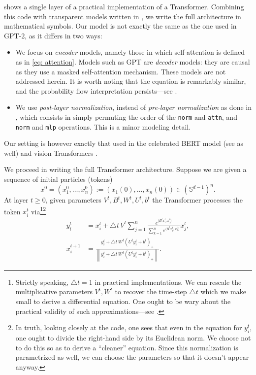 \documentclass[a4paper,11pt]{article}
\theoremstyle{plain}
\renewcommand{\S}{\mathbb{S}^{d-1}}
\newcommand{\bW}{\bm{\mathit{W}}}
\newcommand{\bV}{\bm{\mathit{V}}}
\newcommand{\bB}{\bm{\mathit{B}}}
\newcommand{\bU}{\bm{\mathit{U}}}
\renewcommand{\geq}{\geqslant}
\numberwithin{equation}{section}
\begin{document}
 shows a single layer of a practical implementation of a Transformer. Combining this code with transparent models written in \cite{lu2019understanding, sander2022sinkformers}, we write the full architecture in mathematical symbols. Our model is not exactly the same as the one used in {\sf GPT-2}, as it differs in two ways: 
\begin{itemize}
\item We focus on \emph{encoder} models, namely those in which  self-attention is defined as in \eqref{eq: attention}. Models such as {\sf GPT} are \emph{decoder} models: they are causal as they use a masked self-attention mechanism. 
These models are not addressed herein. It is worth noting that the equation is remarkably similar, and the probability flow interpretation persists---see \cite{castin2023understanding}.

\item We use \emph{post-layer normalization}, instead of \emph{pre-layer normalization} as done in , which consists in simply permuting the order of the {\tt norm} and {\tt attn}, and {\tt norm} and {\tt mlp} operations. This is a minor modeling detail.
\end{itemize}
Our setting is however exactly that used in the celebrated {\sf BERT} model \cite{devlin2018bert} (see \cite[Algorithm 9]{phuong2022formal} as well) and vision Transformers \cite{dosovitskiy2020image}.

We proceed in writing the full Transformer architecture. Suppose we are given a sequence of initial particles (tokens)
\begin{equation*}
    x^0=(x_1^0,\ldots,x_n^0):=(x_1(0),\ldots,x_n(0))\in(\S)^n.
\end{equation*}
At layer $t\geq0$, given parameters $\bV^t, \bB^t, \bW^t, \bU^t, b^t$ the Transformer processes the token $x_i^t$ via\footnote{Strictly speaking, $\bigtriangleup t=1$ in practical implementations. We can rescale the multiplicative parameters $\bV^t,\bW^t$ to recover the time-step  $\bigtriangleup t$ which we make small to derive a differential equation. One ought to be wary about the practical validity of such approximations---see \cite{sander2022residual, marion2023implicit}.}\footnote{In truth, looking closely at the code, one sees that even in the equation for \(y_i^t\), one ought to divide the right-hand side by its Euclidean norm. We choose not to do this so as to derive a ``cleaner'' equation. Since this normalization is parametrized as well, we can choose the parameters so that it doesn't appear anyway.
}
\begin{align*}
y^{t}_i &= x^t_i + \bigtriangleup t\,\bV^t\sum_{j=1}^n \frac{e^{\langle \bB^t x_i^t, x_j^t\rangle}}{\displaystyle \sum_{k=1}^n e^{\langle \bB^t x_i^t, x_k^t\rangle}} x_j^t,\\
x^{t+1}_i &= \frac{y_i^t + \bigtriangleup t\, \bW^t\left(\bU^t y_i^t + b^t\right)_+}{\displaystyle \left\|y_i^t + \bigtriangleup t\, \bW^t\left(\bU^t y_i^t + b^t\right)_+\right\|}.
\end{align*}
\end{document}
